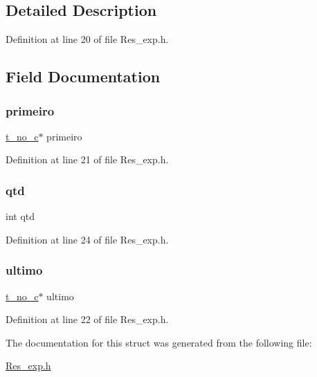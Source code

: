\subsection{Detailed Description}


Definition at line 20 of file Res\+\_\+exp.\+h.



\subsection{Field Documentation}
\mbox{\label{structt__pilha__c_a78b04c824b93d6cb6ce038572bff697b}} 
\subsubsection{\texorpdfstring{primeiro}{primeiro}}
{\footnotesize\ttfamily \mbox{\hyperlink{_res__exp_8h_a49875fde21799e17a8437b9caf0ec7d0}{t\+\_\+no\+\_\+c}}$\ast$ primeiro}



Definition at line 21 of file Res\+\_\+exp.\+h.

\mbox{\label{structt__pilha__c_ab64e355d6f14927f41266ddfbf88ac91}} 
\subsubsection{\texorpdfstring{qtd}{qtd}}
{\footnotesize\ttfamily int qtd}



Definition at line 24 of file Res\+\_\+exp.\+h.

\mbox{\label{structt__pilha__c_a3bffdac0876453bd94bfcf61880645f4}} 
\subsubsection{\texorpdfstring{ultimo}{ultimo}}
{\footnotesize\ttfamily \mbox{\hyperlink{_res__exp_8h_a49875fde21799e17a8437b9caf0ec7d0}{t\+\_\+no\+\_\+c}}$\ast$ ultimo}



Definition at line 22 of file Res\+\_\+exp.\+h.



The documentation for this struct was generated from the following file\+:\begin{DoxyCompactItemize}
\item 
\mbox{\hyperlink{_res__exp_8h}{Res\+\_\+exp.\+h}}\end{DoxyCompactItemize}
